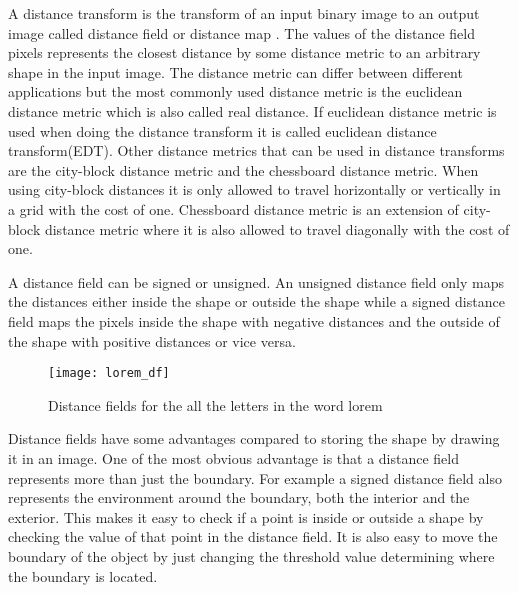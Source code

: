 A distance transform is the transform of an input binary image to an output image called distance field or distance map \citep{rosenfeld1966}. The values of the distance field pixels represents the closest distance by some distance metric to an arbitrary shape in the input image. The distance metric can differ between different applications but the most commonly used distance metric is the euclidean distance metric which is also called real distance. If euclidean distance metric is used when doing the distance transform it is called euclidean distance transform(EDT). Other distance metrics that can be used in distance transforms are the city-block distance metric and the chessboard distance metric. When using city-block distances it is only allowed to travel horizontally or vertically in a grid with the cost of one. Chessboard distance metric is an extension of city-block distance metric where it is also allowed to travel diagonally with the cost of one. 

A distance field can be signed or unsigned. An unsigned distance field only maps the distances either inside the shape or outside the shape while a signed distance field maps the pixels inside the shape with negative distances and the outside of the shape with positive distances or vice versa.

\begin{figure}[H]
\texttt{[image: lorem\_df]}
\caption{Distance fields for the all the letters in the word lorem}
\end{figure}

Distance fields have some advantages compared to storing the shape by drawing it in an image. One of the most obvious advantage is that a distance field represents more than just the boundary. For example a signed distance field also represents the environment around the boundary, both the interior and the exterior. This makes it easy to check if a point is inside or outside a shape by checking the value of that point in the distance field. It is also easy to move the boundary of the object by just changing the threshold value determining where the boundary is located. \citep{Jones2006}

